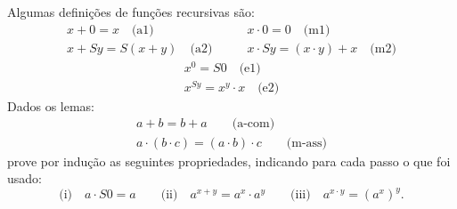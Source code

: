 \begin{exercise}
	Algumas definições de funções recursivas são:
	$$
		\left.
			\begin{aligned}
				x + 0 = x \quad \text{(a1)}\\
				x + Sy = S(x + y) \quad \text {(a2)}
			\end{aligned}
		\right.
		\qquad
		\left.
			\begin{aligned}
				x \cdot 0 = 0 \quad \text{(m1)}\\
				x \cdot Sy = (x \cdot y) + x \quad \text{(m2)}
			\end{aligned}
		\right.
	$$
	$$
		\left.
			\begin{aligned}
				x^0 = S0 \quad \text{(e1)}\\
				x^{Sy} = x^y \cdot x \quad \text{(e2)}
			\end{aligned}
		\right.
	$$
    Dados os lemas:
    $$
		\left.
			\begin{aligned}
			    a + b = b + a \qquad \text{(a-com)}\\
			    a \cdot (b \cdot c) = (a \cdot b) \cdot c \qquad \text{(m-ass)}
			\end{aligned}
		\right.
	$$
    prove por indução as seguintes propriedades, indicando para cada passo o que foi usado:
	$$
		\text{(i)}
			\quad a \cdot S0 = a
			\qquad
			\text{(ii)}
				\quad a^{x + y} = a^x \cdot a^y
			\qquad
			\text{(iii)}
				\quad a^{x \cdot y} = (a^x)^{y}.
	$$
\end{exercise}
